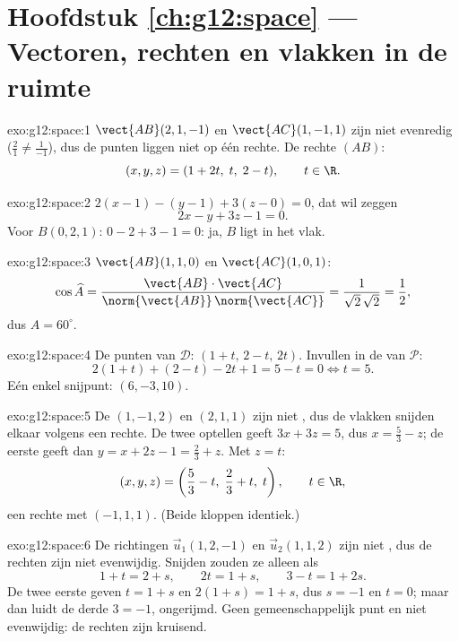 \section*{Hoofdstuk \ref{ch:g12:space} --- Vectoren, rechten en vlakken in de ruimte}

\begin{solution}{exo:g12:space:1}
$\vect{AB}(2, 1, -1)$ en $\vect{AC}(1, -1, 1)$ zijn niet evenredig
($\frac21 \neq \frac{1}{-1}$), dus de punten liggen niet op één rechte. De
rechte $(AB)$:
\[
(x, y, z) = (1 + 2t,\; t,\; 2 - t), \qquad t \in \R .
\]
\end{solution}

\begin{solution}{exo:g12:space:2}
$2(x - 1) - (y - 1) + 3(z - 0) = 0$, dat wil zeggen
\[
2x - y + 3z - 1 = 0 .
\]
Voor $B(0,2,1)$: $0 - 2 + 3 - 1 = 0$: ja, $B$ ligt in het vlak.
\end{solution}

\begin{solution}{exo:g12:space:3}
$\vect{AB}(1,1,0)$ en $\vect{AC}(1,0,1)$:
\[
\cos\widehat{A}
= \frac{\vect{AB}\cdot\vect{AC}}{\norm{\vect{AB}}\,\norm{\vect{AC}}}
= \frac{1}{\sqrt2\,\sqrt2} = \frac12,
\]
dus $\widehat A = 60^\circ$.
\end{solution}

\begin{solution}{exo:g12:space:4}
De punten van $\mathcal D$: $(1 + t,\, 2 - t,\, 2t)$. Invullen in de
 van $\mathcal P$:
\[
2(1+t) + (2 - t) - 2t + 1 = 5 - t = 0 \iff t = 5 .
\]
Eén enkel snijpunt: $(6, -3, 10)$.
\end{solution}

\begin{solution}{exo:g12:space:5}
De  $(1, -1, 2)$ en $(2, 1, 1)$ zijn niet , dus de
vlakken snijden elkaar volgens een rechte. De twee  optellen
geeft $3x + 3z = 5$, dus $x = \frac53 - z$; de eerste  geeft dan
$y = x + 2z - 1 = \frac23 + z$. Met $z = t$:
\[
(x, y, z) = \left(\frac53 - t,\; \frac23 + t,\; t\right), \qquad t \in \R,
\]
een rechte met  $(-1, 1, 1)$. (Beide  kloppen
identiek.)
\end{solution}

\begin{solution}{exo:g12:space:6}
De richtingen $\vec u_1(1, 2, -1)$ en $\vec u_2(1, 1, 2)$ zijn niet
, dus de rechten zijn niet evenwijdig. Snijden zouden ze alleen als
\[
1 + t = 2 + s, \qquad 2t = 1 + s, \qquad 3 - t = 1 + 2s .
\]
De twee eerste geven $t = 1 + s$ en $2(1+s) = 1 + s$, dus $s = -1$ en
$t = 0$; maar dan luidt de derde $3 = -1$, ongerijmd. Geen gemeenschappelijk
punt en niet evenwijdig: de rechten zijn kruisend.
\end{solution}

